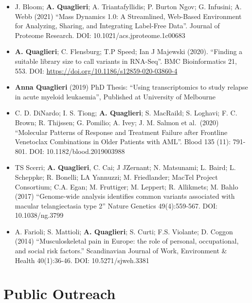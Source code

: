 \documentclass[11pt,a4paper,]{awesome-cv}
\begin{document}
\begin{itemize}
\item
  J. Bloom; \textbf{A. Quaglieri}; A. Triantafyllidis; P. Burton Ngov;
  G. Infusini; A. Webb (2021) ``Mass Dynamics 1.0: A Streamlined,
  Web-Based Environment for Analyzing, Sharing, and Integrating
  Label-Free Data''. Journal of Proteome Research. DOI:
  10.1021/acs.jproteome.1c00683
  \href{10.1021/acs.jproteome.1c00683}{\faExternalLink}
\item
  \textbf{A. Quaglieri}; C. Flensburg; T.P Speed; Ian J Majewski (2020).
  ``Finding a suitable library size to call variants in RNA-Seq''. BMC
  Bioinformatics 21, 553. DOI:
  \url{https://doi.org/10.1186/s12859-020-03860-4}
  \href{https://doi.org/10.1186/s12859-020-03860-4}{\faExternalLink}
\item
  \textbf{Anna Quaglieri} (2019) PhD Thesis: ``Using transcriptomics to
  study relapse in acute myeloid leukaemia'', Published at University of
  Melbourne \href{shorturl.at/drABC}{\faExternalLink}
\item
  C. D. DiNardo; I. S. Tiong; \textbf{A. Quaglieri}; S. MacRaild; S.
  Loghavi; F. C. Brown; R. Thijssen; G. Pomilio; A. Ivey; J. M. Salmon
  et al.~(2020) ``Molecular Patterns of Response and Treatment Failure
  after Frontline Venetoclax Combinations in Older Patients with AML''.
  Blood 135 (11): 791-801. DOI: 10.1182/blood.2019003988
  \href{10.1182/blood.2019003988}{\faExternalLink}
\item
  TS Scerri; \textbf{A. Quaglieri}, C. Cai; J JZernant; N. Matsunami; L.
  Baird; L. Scheppke; R. Bonelli; LA Yannuzzi; M. Friedlander; MacTel
  Project Consortium; C.A. Egan; M. Fruttiger; M. Leppert; R. Allikmets;
  M. Bahlo (2017) ``Genome-wide analysis identifies common variants
  associated with macular telangiectasia type 2'' Nature Genetics
  49(4):559-567. DOI: 10.1038/ng.3799
  \href{10.1038/ng.3799}{\faExternalLink}
\item
  A. Farioli; S. Mattioli; \textbf{A. Quaglieri}; S. Curti; F.S.
  Violante; D. Coggon (2014) ``Musculoskeletal pain in Europe: the role
  of personal, occupational, and social risk factors.'' Scandinavian
  Journal of Work, Environment \& Health 40(1):36-46. DOI:
  10.5271/sjweh.3381 \href{10.5271/sjweh.3381}{\faExternalLink}
\end{itemize}

\hypertarget{public-outreach}{%
\section{Public Outreach}\label{public-outreach}}
\end{document}

